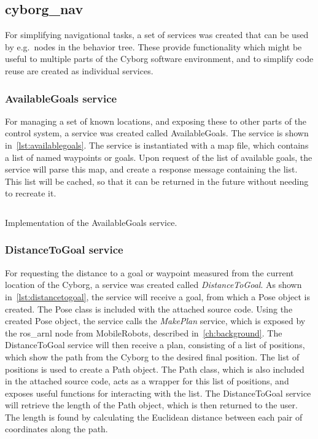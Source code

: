 \documentclass[\rootfolder/main.tex]{subfiles}
\begin{document}
\subsection{cyborg\_nav}

For simplifying navigational tasks, a set of services was created that can be used by e.g.\ nodes in the behavior tree.
These provide functionality which might be useful to multiple parts of the Cyborg software environment, and to simplify code reuse are created as individual services.

\subsubsection{AvailableGoals service}

For managing a set of known locations, and exposing these to other parts of the control system, a service was created called AvailableGoals.
The service is shown in~\cref{lst:availablegoals}.
The service is instantiated with a map file, which contains a list of named waypoints or goals.
Upon request of the list of available goals, the service will parse this map, and create a response message containing the list.
This list will be cached, so that it can be returned in the future without needing to recreate it.

\begin{listing}
    \inputminted[fontsize=\scriptsize]{python}{\rootfolder/Chapters/Chapter6/Listings/available_goals.py}
    \caption{Implementation of the AvailableGoals service.}
    \label{lst:availablegoals}
\end{listing}

\subsubsection{DistanceToGoal service}

For requesting the distance to a goal or waypoint measured from the current location of the Cyborg, a service was created called \emph{DistanceToGoal}.
As shown in~\cref{lst:distancetogoal}, the service will receive a goal, from which a Pose object is created.
The Pose class is included with the attached source code.
Using the created Pose object, the service calls the \emph{MakePlan} service, which is exposed by the ros\_arnl node from MobileRobots, described in~\cref{ch:background}.
The DistanceToGoal service will then receive a plan, consisting of a list of positions, which show the path from the Cyborg to the desired final position.
The list of positions is used to create a Path object.
The Path class, which is also included in the attached source code, acts as a wrapper for this list of positions, and exposes useful functions for interacting with the list.
The DistanceToGoal service will retrieve the length of the Path object, which is then returned to the user.
The length is found by calculating the Euclidean distance between each pair of coordinates along the path.
\end{document}
